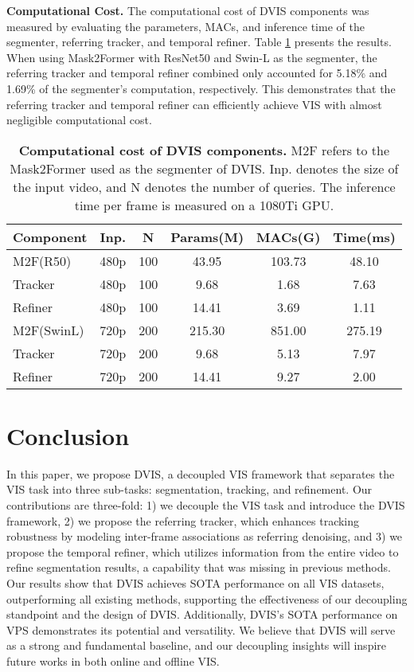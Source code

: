 \documentclass[10pt,twocolumn,letterpaper]{article}
\begin{document}
\textbf{Computational Cost.} The computational cost of DVIS components was measured by evaluating the parameters, MACs, and inference time of the segmenter, referring tracker, and temporal refiner. Table \ref{tab:consumption} presents the results. When using Mask2Former with ResNet50 and Swin-L as the segmenter, the referring tracker and temporal refiner combined only accounted for 5.18\% and 1.69\% of the segmenter's computation, respectively. This demonstrates that the referring tracker and temporal refiner can efficiently achieve VIS with almost negligible computational cost.
\begin{table}[t]
\centering
\setlength{\tabcolsep}{0.7mm}
\vspace{-6mm}
\begin{tabular}{l|c|c|ccc}
	Component & Inp. & N & Params(M) & MACs(G) & Time(ms) \\
	\hline
	M2F(R50) & 480p & 100 & 43.95 & 103.73 & 48.10 \\
	Tracker & 480p & 100 & 9.68 & 1.68 & 7.63 \\
	Refiner & 480p & 100 & 14.41 & 3.69 & 1.11 \\
	\hline
	M2F(SwinL) & 720p & 200 & 215.30 & 851.00 & 275.19 \\
	Tracker & 720p & 200 & 9.68 & 5.13 & 7.97 \\
	Refiner & 720p & 200 & 14.41 & 9.27 & 2.00 \\
\hline
 \end{tabular}
  \caption{\textbf{Computational cost of DVIS components.} M2F refers to the Mask2Former used as the segmenter of DVIS. Inp. denotes the size of the input video, and N denotes the number of queries. The inference time per frame is measured on a 1080Ti GPU.}\vspace{-4mm}
 \label{tab:consumption}
\end{table}


\section{Conclusion}\vspace{-2mm}
In this paper, we propose DVIS, a decoupled VIS framework that separates the VIS task into three sub-tasks: segmentation, tracking, and refinement. Our contributions are three-fold: 1) we decouple the VIS task and introduce the DVIS framework, 2) we propose the referring tracker, which enhances tracking robustness by modeling inter-frame associations as referring denoising, and 3) we propose the temporal refiner, which utilizes information from the entire video to refine segmentation results, a capability that was missing in previous methods. Our results show that DVIS achieves SOTA performance on all VIS datasets, outperforming all existing methods, supporting the effectiveness of our decoupling standpoint and the design of DVIS. Additionally, DVIS's SOTA performance on VPS demonstrates its potential and versatility. We believe that DVIS will serve as a strong and fundamental baseline, and our decoupling insights will inspire future works in both online and offline VIS.
\end{document}
